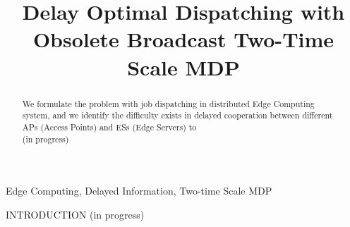 \documentclass[10pt, conference, letterpaper]{IEEEtran}
\begin{document}
    \title{
        Delay Optimal Dispatching with Obsolete Broadcast Two-Time Scale MDP
    }
    \author{
    }
    \maketitle

    \begin{abstract}
        \label{sec:abstract}
        We formulate the problem with job dispatching in distributed Edge Computing system, and we identify the difficulty exists in delayed cooperation between different APs (Access Points) and ESs (Edge Servers) to 
        \\
        (in progress)
    \end{abstract}

    \begin{IEEEkeywords}
        Edge Computing, Delayed Information, Two-time Scale MDP
    \end{IEEEkeywords}

    \begin{section}{INTRODUCTION}
        \label{sec:introduction}
        (in progress)
        \cite{sutton1998introduction}
    \end{section}

\end{document}
